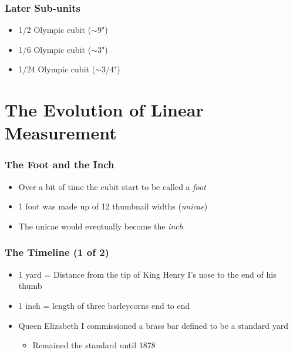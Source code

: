 \begin{frame}
	\frametitle{Later Sub-units}

    \begin{itemize}[<+- | alert@+>]
        \item[Span] 1/2 Olympic cubit ($\sim$9")
        \item[Palm] 1/6 Olympic cubit ($\sim$3")
        \item[Digit] 1/24 Olympic cubit ($\sim$3/4")
    \end{itemize}
\end{frame}

\section{The Evolution of Linear Measurement}

\begin{frame}
	\frametitle{The Foot and the Inch}

    \begin{itemize}[<+- | alert@+>]
        \item Over a bit of time the cubit start to be called a \emph{foot}
        \item 1 foot was made up of 12 thumbnail widths (\emph{unicae})
        \item The unicae would eventually become the \emph{inch}
    \end{itemize}
\end{frame}

\begin{frame}
	\frametitle{The Timeline (1 of 2)}
    \begin{itemize}[<+- | alert@+>]
        \item[12$^{th}$ century] 1 yard = Distance from the tip of King Henry I's nose to the end of his thumb
        \item[1324] 1 inch = length of three barleycorns end to end
        \item[1588] Queen Elizabeth I commissioned a brass bar defined to be a standard yard
        \begin{itemize}
            \item Remained the standard until 1878
        \end{itemize}
    \end{itemize}
\end{frame}

